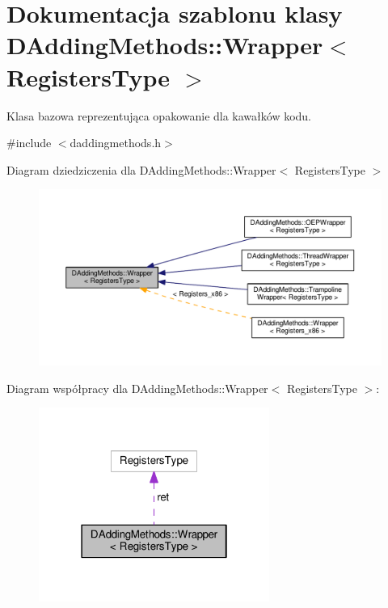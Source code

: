\hypertarget{class_d_adding_methods_1_1_wrapper}{\section{Dokumentacja szablonu klasy D\-Adding\-Methods\-:\-:Wrapper$<$ Registers\-Type $>$}
\label{class_d_adding_methods_1_1_wrapper}
}


Klasa bazowa reprezentująca opakowanie dla kawałków kodu.  




{\ttfamily \#include $<$daddingmethods.\-h$>$}



Diagram dziedziczenia dla D\-Adding\-Methods\-:\-:Wrapper$<$ Registers\-Type $>$
\nopagebreak
\begin{figure}[H]
\begin{center}
\leavevmode
\includegraphics[width=350pt]{class_d_adding_methods_1_1_wrapper__inherit__graph}
\end{center}
\end{figure}


Diagram współpracy dla D\-Adding\-Methods\-:\-:Wrapper$<$ Registers\-Type $>$\-:
\nopagebreak
\begin{figure}[H]
\begin{center}
\leavevmode
\includegraphics[width=214pt]{class_d_adding_methods_1_1_wrapper__coll__graph}
\end{center}
\end{figure}
